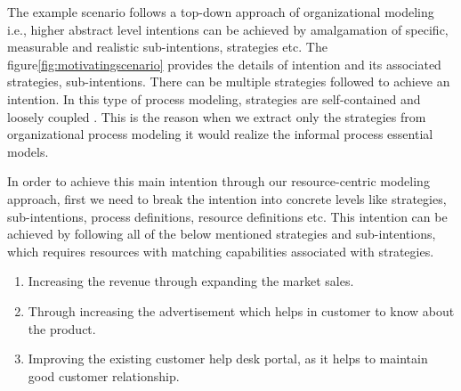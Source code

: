 The example scenario follows a top-down approach of organizational modeling i.e., higher abstract level intentions can be achieved by amalgamation of specific, measurable and realistic sub-intentions, strategies etc. The figure\ref{fig:motivatingscenario} provides the details of intention and its associated strategies, sub-intentions. There can be multiple strategies followed to achieve an intention. In this type of process modeling, strategies are self-contained and loosely coupled  \cite{Sungur2014a}. This is the reason when we extract only the strategies from organizational process modeling it would realize the informal process essential models. 
 
In order to achieve this main intention through our resource-centric modeling approach, first we need to break the intention into concrete levels like strategies, sub-intentions, process definitions, resource definitions etc. This intention can be achieved by following all of the below mentioned strategies and sub-intentions, which requires resources with matching capabilities associated with strategies. 
 
 \begin{enumerate}
 	\item Increasing the revenue through expanding the market sales. 
 	\item Through increasing the advertisement which helps in customer to know about the product.
 	\item Improving the existing customer help desk portal, as it helps to maintain good customer relationship.
 \end{enumerate}
 
